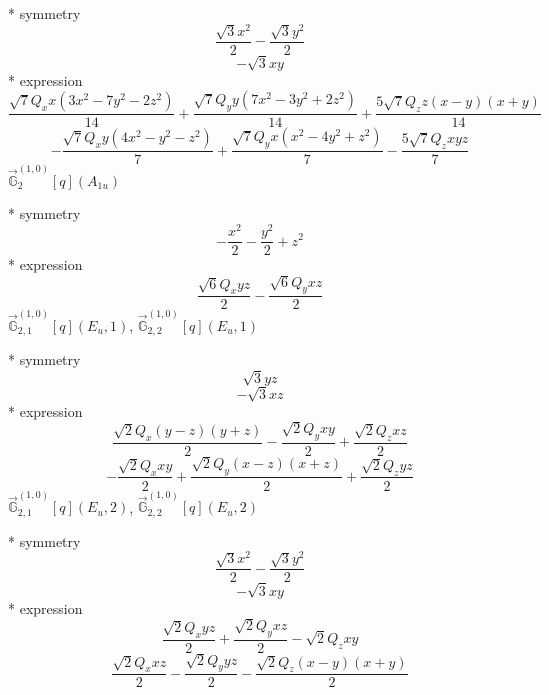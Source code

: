 \documentclass[fleqn,8pt]{jsarticle}
\begin{document}
\noindent\quad ** symmetry
\begin{dmath*}
\frac{\sqrt{3} x^{2}}{2} - \frac{\sqrt{3} y^{2}}{2}
\end{dmath*}
\begin{dmath*}
- \sqrt{3} x y
\end{dmath*}
\noindent\quad ** expression
\begin{dmath*}
\frac{\sqrt{7} Q_{x} x \left(3 x^{2} - 7 y^{2} - 2 z^{2}\right)}{14} + \frac{\sqrt{7} Q_{y} y \left(7 x^{2} - 3 y^{2} + 2 z^{2}\right)}{14} + \frac{5 \sqrt{7} Q_{z} z \left(x - y\right) \left(x + y\right)}{14}
\end{dmath*}
\begin{dmath*}
- \frac{\sqrt{7} Q_{x} y \left(4 x^{2} - y^{2} - z^{2}\right)}{7} + \frac{\sqrt{7} Q_{y} x \left(x^{2} - 4 y^{2} + z^{2}\right)}{7} - \frac{5 \sqrt{7} Q_{z} x y z}{7}
\end{dmath*}
\noindent\quad $\vec{\mathbb{G}}_{2}^{(1,0)}[q](A_{1u})$

\noindent\quad ** symmetry
\begin{dmath*}
- \frac{x^{2}}{2} - \frac{y^{2}}{2} + z^{2}
\end{dmath*}
\noindent\quad ** expression
\begin{dmath*}
\frac{\sqrt{6} Q_{x} y z}{2} - \frac{\sqrt{6} Q_{y} x z}{2}
\end{dmath*}
\noindent\quad $\vec{\mathbb{G}}_{2,1}^{(1,0)}[q](E_{u},1)$, $\vec{\mathbb{G}}_{2,2}^{(1,0)}[q](E_{u},1)$

\noindent\quad ** symmetry
\begin{dmath*}
\sqrt{3} y z
\end{dmath*}
\begin{dmath*}
- \sqrt{3} x z
\end{dmath*}
\noindent\quad ** expression
\begin{dmath*}
\frac{\sqrt{2} Q_{x} \left(y - z\right) \left(y + z\right)}{2} - \frac{\sqrt{2} Q_{y} x y}{2} + \frac{\sqrt{2} Q_{z} x z}{2}
\end{dmath*}
\begin{dmath*}
- \frac{\sqrt{2} Q_{x} x y}{2} + \frac{\sqrt{2} Q_{y} \left(x - z\right) \left(x + z\right)}{2} + \frac{\sqrt{2} Q_{z} y z}{2}
\end{dmath*}
\noindent\quad $\vec{\mathbb{G}}_{2,1}^{(1,0)}[q](E_{u},2)$, $\vec{\mathbb{G}}_{2,2}^{(1,0)}[q](E_{u},2)$

\noindent\quad ** symmetry
\begin{dmath*}
\frac{\sqrt{3} x^{2}}{2} - \frac{\sqrt{3} y^{2}}{2}
\end{dmath*}
\begin{dmath*}
- \sqrt{3} x y
\end{dmath*}
\noindent\quad ** expression
\begin{dmath*}
\frac{\sqrt{2} Q_{x} y z}{2} + \frac{\sqrt{2} Q_{y} x z}{2} - \sqrt{2} Q_{z} x y
\end{dmath*}
\begin{dmath*}
\frac{\sqrt{2} Q_{x} x z}{2} - \frac{\sqrt{2} Q_{y} y z}{2} - \frac{\sqrt{2} Q_{z} \left(x - y\right) \left(x + y\right)}{2}
\end{dmath*}
\end{document}
